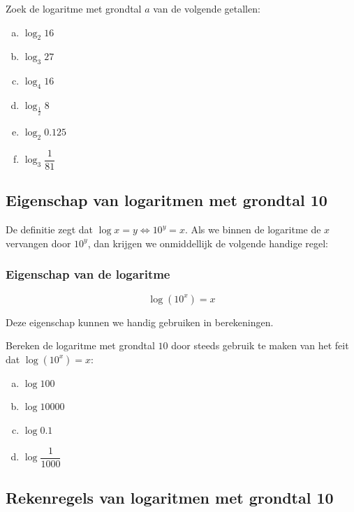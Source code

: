 \documentclass[12pt,twoside,a4paper]{article}
\begin{document}
\begin{oefening}
Zoek de logaritme met grondtal $a$ van de volgende getallen:\\
\begin{multicols}{2}
\begin{enumerate}[(a)]
  \itemsep1em
  \item $\log_2 16$
  \item $\log_3 27$
  \item $\log_4 16$
  \item $\log_{\frac{1}{2}} 8$
  \item $\log_2 0.125$
  \item $\log_3 \dfrac{1}{81}$
\end{enumerate}
\end{multicols}
\end{oefening}

\subsection{Eigenschap van logaritmen met grondtal 10}

De definitie zegt dat $\log x = y \Leftrightarrow 10^y = x$. Als we binnen de logaritme de $x$ vervangen door $10^y$, dan krijgen we onmiddellijk de volgende handige regel:

\subsubsection*{Eigenschap van de logaritme}
\begin{mdframed}
$$\log (10^x) = x$$
\end{mdframed}

Deze eigenschap kunnen we handig gebruiken in berekeningen.

\begin{oefening}
Bereken de logaritme met grondtal $10$ door steeds gebruik te maken van het feit dat $\log (10^x) = x$:
\begin{multicols}{2}
\begin{enumerate}[(a)]
  \itemsep1em
  \item $\log 100$
  \item $\log 10000$
  \item $\log 0.1$
  \item $\log \dfrac{1}{1000}$
\end{enumerate}
\end{multicols}
\end{oefening}

\subsection{Rekenregels van logaritmen met grondtal 10}
\end{document}
